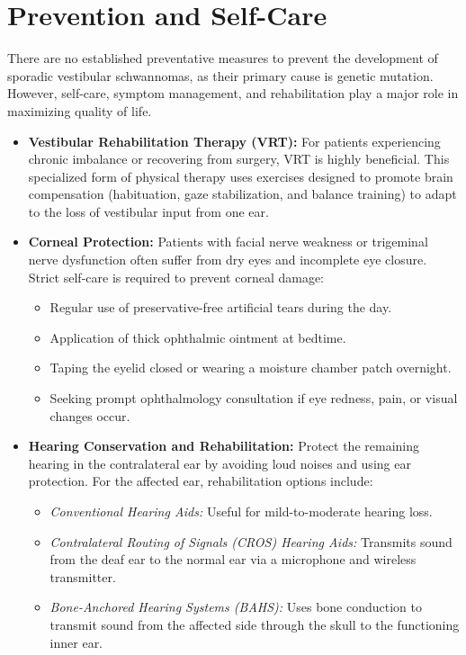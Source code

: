 \section*{Prevention and Self-Care}
There are no established preventative measures to prevent the development of sporadic vestibular schwannomas, as their primary cause is genetic mutation. However, self-care, symptom management, and rehabilitation play a major role in maximizing quality of life.
\begin{itemize}
    \item \textbf{Vestibular Rehabilitation Therapy (VRT):} For patients experiencing chronic imbalance or recovering from surgery, VRT is highly beneficial. This specialized form of physical therapy uses exercises designed to promote brain compensation (habituation, gaze stabilization, and balance training) to adapt to the loss of vestibular input from one ear.
    \item \textbf{Corneal Protection:} Patients with facial nerve weakness or trigeminal nerve dysfunction often suffer from dry eyes and incomplete eye closure. Strict self-care is required to prevent corneal damage:
    \begin{itemize}
        \item Regular use of preservative-free artificial tears during the day.
        \item Application of thick ophthalmic ointment at bedtime.
        \item Taping the eyelid closed or wearing a moisture chamber patch overnight.
        \item Seeking prompt ophthalmology consultation if eye redness, pain, or visual changes occur.
    \end{itemize}
    \item \textbf{Hearing Conservation and Rehabilitation:} Protect the remaining hearing in the contralateral ear by avoiding loud noises and using ear protection. For the affected ear, rehabilitation options include:
    \begin{itemize}
        \item \textit{Conventional Hearing Aids:} Useful for mild-to-moderate hearing loss.
        \item \textit{Contralateral Routing of Signals (CROS) Hearing Aids:} Transmits sound from the deaf ear to the normal ear via a microphone and wireless transmitter.
        \item \textit{Bone-Anchored Hearing Systems (BAHS):} Uses bone conduction to transmit sound from the affected side through the skull to the functioning inner ear.

\end{itemize}
\end{itemize}
